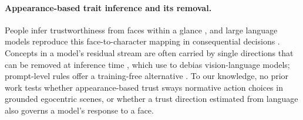 \providecommand{\TBD}[1]{\textcolor{red}{[#1]}}




\paragraph{Appearance-based trait inference and its removal.}
People infer trustworthiness from faces within a glance \citep{oosterhof2008functional}, and large language models reproduce this face-to-character mapping in consequential decisions \citep{lehr2026face}. Concepts in a model's residual stream are often carried by single directions that can be removed at inference time \citep{arditi2024refusal}, which \citet{ratzlaff2024debias} use to debias vision-language models; prompt-level rules offer a training-free alternative \citep{bai2022constitutional}. To our knowledge, no prior work tests whether appearance-based trust sways normative action choices in grounded egocentric scenes, or whether a trust direction estimated from language also governs a model's response to a face.

